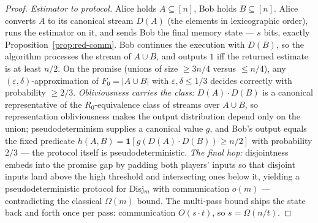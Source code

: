 \begin{proof}
\emph{Estimator to protocol.} Alice holds $A \subseteq [n]$, Bob holds $B \subseteq
[n]$. Alice converts $A$ to its canonical stream $D(A)$ (the elements in
lexicographic order), runs the estimator on it, and sends Bob the final memory state
--- $s$ bits, exactly Proposition~\ref{prop:red-comm}. Bob continues the execution
with $D(B)$, so the algorithm processes the stream of $A \cup B$, and outputs $1$ iff
the returned estimate is at least $n/2$. On the promise (unions of size $\ge 3n/4$
versus $\le n/4$), any $(\varepsilon, \delta)$-approximation of $F_0 = |A \cup B|$
with $\varepsilon, \delta \le 1/3$ decides correctly with probability $\ge 2/3$.
\emph{Obliviousness carries the class:} $D(A) \cdot D(B)$ is a canonical
representative of the $R_0$-equivalence class of streams over $A \cup B$, so
representation obliviousness makes the output distribution depend only on the union;
pseudodeterminism supplies a canonical value $g$, and Bob's output equals the fixed
predicate $h(A,B) = \mathbf{1}[g(D(A)\cdot D(B)) \ge n/2]$ with probability $2/3$ ---
the protocol itself is pseudodeterministic. \emph{The final hop:} disjointness
embeds into the promise gap by padding both players' inputs so that disjoint inputs
land above the high threshold and intersecting ones below it, yielding a
pseudodeterministic protocol for Disj$_m$ with communication $o(m)$ --- contradicting
the classical $\Omega(m)$ bound. The multi-pass bound ships the state back and
forth once per pass: communication $O(s \cdot t)$, so $s = \Omega(n/t)$.
\end{proof}



